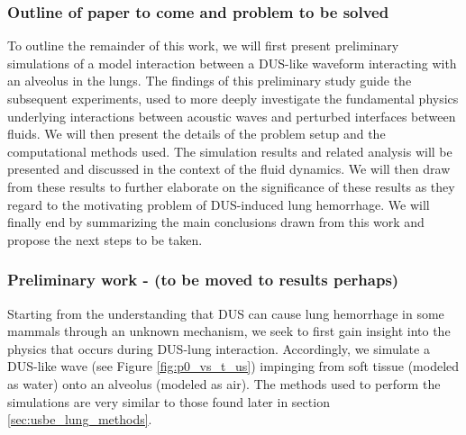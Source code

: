 \subsubsection*{Outline of paper to come and problem to be solved}
To outline the remainder of this work, we will first present
preliminary simulations of a model interaction between a \ac{DUS}-like
waveform interacting with an alveolus in the lungs. The findings of
this preliminary study guide the subsequent experiments, used to more
deeply investigate the fundamental physics underlying interactions
between acoustic waves and perturbed interfaces between fluids. We
will then present the details of the problem setup and the
computational methods used. The simulation results and related
analysis will be presented and discussed in the context of the fluid
dynamics. We will then draw from these results to further elaborate on
the significance of these results as they regard to the motivating
problem of \ac{DUS}-induced lung hemorrhage. We will finally end by
summarizing the main conclusions drawn from this work and propose the
next steps to be taken.


\subsubsection*{Preliminary work - (to be moved to results perhaps)}
Starting from the understanding that \ac{DUS} can cause lung
hemorrhage in some mammals through an unknown mechanism, we seek to
first gain insight into the physics that occurs during \ac{DUS}-lung
interaction.  Accordingly, we simulate a \ac{DUS}-like wave (see
Figure \ref{fig:p0_vs_t_us}) impinging from soft tissue (modeled as
water) onto an alveolus (modeled as air). The methods used to perform
the simulations are very similar to those found later in section
\ref{sec:usbe_lung_methods}. 

